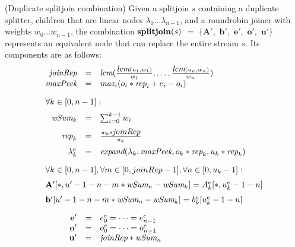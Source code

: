 \begin{transformation} (Duplicate splitjoin combination)
Given a splitjoin $s$ containing a duplicate splitter, children that
are linear nodes $\lambda_0 \dots \lambda_{n-1}$, and a roundrobin
joiner with weights $w_0 \dots w_{n-1}$, the combination $\mbox{\bf
splitjoin}(s)$ $=$ $\mathbf{ \{A',}$ $\mathbf{b',}$ $\mathbf{e',}$
$\mathbf{o',}$ $\mathbf{u'\}}$ represents an equivalent node that can
replace the entire stream $s$.  Its components are as follows:
\begin{equation} \nonumber
\begin{array}{rcl}
\mt{joinRep} & = & \mt{lcm}(\frac{\mt{lcm}(u_1,w_1)}{w_1}, \dots, \frac{\mt{lcm}(u_n,w_n)}{w_n}) \\
\mt{maxPeek} & = & \mt{max}_i (o_i * \mt{rep}_i + e_i - o_i) \\ ~ \vspace{-2pt} \\
\multicolumn{3}{l}{\forall k \in [0, n-1]:} \\ ~ \vspace{-6pt} \\
\mt{wSum}_k & = & \sum_{i=0}^{k-1} w_i \\ ~ \vspace{-6pt} \\
\mt{rep}_k & = & \frac{w_k * \mt{joinRep}}{u_k} \\ ~ \vspace{-6pt} \\
\lambda_k^e & = & \mt{expand}(\lambda_k, \mt{maxPeek}, 
                              o_k * \mt{rep}_k, u_k * \mt{rep}_k) \\ ~ \vspace{-2pt} \\
\multicolumn{3}{l}{\forall k \in [0, n-1], \forall m \in [0, joinRep-1], \forall n \in [0, u_k-1]:} \\ ~ \vspace{-6pt} \\
\multicolumn{3}{l}{\mathbf{A'}[*, u'-1-n - m * \mt{wSum}_{n}-\mt{wSum}_{k}] = 
  A_{k}^e [*,u_k^e-1-n]} \\ ~ \vspace{-6pt} \\
\multicolumn{3}{l}{\mathbf{b'}[u'-1-n - m * \mt{wSum}_{n}-\mt{wSum}_{k}] = 
  b_{k}^e [u_k^e-1-n]} \\ ~ \vspace{-2pt} \\
\mathbf{e'} & = & e_0^e = \dots = e_{n-1}^e \\
\mathbf{o'} & = & o_0^e = \dots = o_{n-1}^e \\
\mathbf{u'} & = & \mt{joinRep} * \mt{wSum}_n \\
\end{array}
\end{equation}
\end{transformation}

